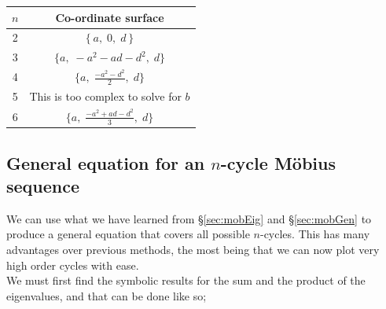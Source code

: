 \documentclass[12pt]{article}
\begin{document}
	\begin{table}[H]
		\begin{center}
			\begin{tabular}{|c|c|}
				\hline
				$n$ &          Co-ordinate surface          \\[4pt] \hline\hline
				 2  &    $\left\{a,\; 0,\; d \right\} $     \\[4pt] \hline
				 3  &      $\{a,\; -a^2-ad-d^2,\; d\}$      \\[4pt] \hline
				 4  &  $\{a,\;\frac{-a^2-d^2}{2},\; d\} $   \\[4pt] \hline
				 5  & This is too complex to solve for $b$  \\[4pt] \hline
				 6  & $\{a,\;\frac{-a^2+ad-d^2}{3},\; d\} $ \\[4pt] \hline
			\end{tabular}
		\end{center}
	\end{table}
\newpage
\subsection{General equation for an $n$-cycle Möbius sequence}\label{sec:mobGenEq}
We can use what we have learned from \S\ref{sec:mobEig} and \S\ref{sec:mobGen} to produce a general equation that covers all possible $n$-cycles. This has many advantages over previous methods, the most being that we can now plot very high order cycles with ease.\\
We must first find the symbolic results for the sum and the product of the eigenvalues, and that can be done like so;
\end{document}
